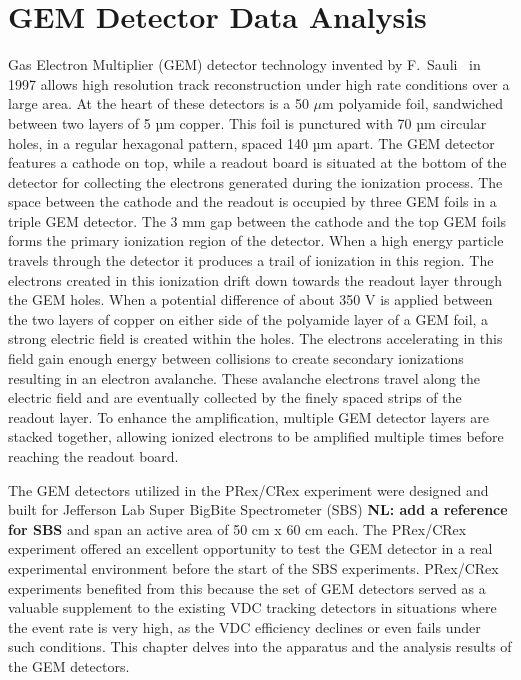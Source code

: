 \chapter{GEM Detector Data Analysis}
Gas Electron Multiplier (GEM) detector technology invented by F.~Sauli~\cite{Sauli} in 1997 allows  high resolution track reconstruction under high rate conditions over a large area.  At the heart of these detectors is a 50 $\mu$m polyamide foil, sandwiched between two layers of 5 µm copper.  This foil is punctured with 70 µm circular holes, in a regular hexagonal pattern, spaced 140 µm apart. The GEM detector  features a cathode on top, while a readout board is situated  at the bottom of the detector  for collecting the electrons generated during the ionization process. The space between the cathode and the readout is occupied by three GEM foils 
 in a triple GEM detector. The 3 mm gap between the cathode and the top GEM foils forms the primary  ionization region of the detector. When a high energy particle travels through the detector it produces a trail of ionization in this region. The electrons created in this ionization drift down towards the readout layer through the GEM holes. When a potential difference of about  350 V is applied between the two layers of copper on either side of the polyamide layer of a GEM foil,    a strong  electric field is created  within the holes.  The electrons accelerating in this field gain enough energy between collisions to  create secondary ionizations  resulting  in an electron avalanche. These avalanche electrons travel along the electric field and are  eventually collected by the finely spaced strips of the readout layer. To enhance the amplification, multiple GEM detector layers are stacked together, allowing ionized electrons to be amplified multiple times before reaching the readout board.

The GEM detectors utilized in the PRex/CRex experiment were  designed  and built for Jefferson Lab Super BigBite Spectrometer (SBS) {\bf NL: add a reference for SBS} and span an active area of 50 cm x 60 cm each.  The PRex/CRex experiment offered an excellent opportunity to test the GEM detector in a real experimental environment before  the start of  the SBS experiments. PRex/CRex experiments benefited from this because the set of GEM detectors served as a valuable supplement to the existing VDC tracking detectors in situations where the event rate is very high, as the VDC efficiency declines or even fails under such conditions. This chapter delves into the apparatus and the analysis results of the GEM detectors.

